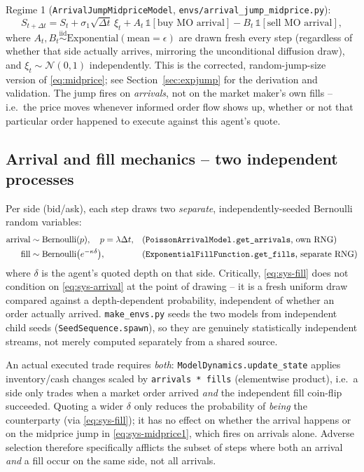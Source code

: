 \documentclass[11pt]{article}
\newcommand{\N}{\mathcal{N}}
\begin{document}
Regime 1 (\texttt{ArrivalJumpMidpriceModel}, \texttt{envs/arrival\_jump\_midprice.py}):
\begin{equation}
S_{t+\Delta t} = S_t + \sigma_1\sqrt{\Delta t}\,\xi_t + A_t\,\mathbb{1}[\text{buy MO arrival}] - B_t\,\mathbb{1}[\text{sell MO arrival}],
\label{eq:sys-midprice1}
\end{equation}
where $A_t, B_t \overset{\text{iid}}{\sim} \mathrm{Exponential}(\text{mean}=\epsilon)$ are drawn fresh every step (regardless of whether that side actually arrives, mirroring the unconditional diffusion draw), and $\xi_t\sim\N(0,1)$ independently. This is the corrected, random-jump-size version of \eqref{eq:midprice}; see Section~\ref{sec:expjump} for the derivation and validation. The jump fires on \emph{arrivals}, not on the market maker's own fills -- i.e.\ the price moves whenever informed order flow shows up, whether or not that particular order happened to execute against this agent's quote.

\subsection{Arrival and fill mechanics -- two independent processes}
\label{sec:sys-arrivalfill}
Per side (bid/ask), each step draws two \emph{separate}, independently-seeded Bernoulli random variables:
\begin{align}
\text{arrival} &\sim \mathrm{Bernoulli}(p), \quad p = \lambda\Delta t, &&\text{(\texttt{PoissonArrivalModel.get\_arrivals}, own RNG)} \label{eq:sys-arrival}\\
\text{fill} &\sim \mathrm{Bernoulli}\big(e^{-\kappa\delta}\big), &&\text{(\texttt{ExponentialFillFunction.get\_fills}, separate RNG)} \label{eq:sys-fill}
\end{align}
where $\delta$ is the agent's quoted depth on that side. Critically, \eqref{eq:sys-fill} does not condition on \eqref{eq:sys-arrival} at the point of drawing -- it is a fresh uniform draw compared against a depth-dependent probability, independent of whether an order actually arrived. \texttt{make\_envs.py} seeds the two models from independent child seeds (\texttt{SeedSequence.spawn}), so they are genuinely statistically independent streams, not merely computed separately from a shared source.

An actual executed trade requires \emph{both}: \texttt{ModelDynamics.update\_state} applies inventory/cash changes scaled by \texttt{arrivals * fills} (elementwise product), i.e.\ a side only trades when a market order arrived \emph{and} the independent fill coin-flip succeeded. Quoting a wider $\delta$ only reduces the probability of \emph{being} the counterparty (via \eqref{eq:sys-fill}); it has no effect on whether the arrival happens or on the midprice jump in \eqref{eq:sys-midprice1}, which fires on arrivals alone. Adverse selection therefore specifically afflicts the subset of steps where both an arrival \emph{and} a fill occur on the same side, not all arrivals.
\end{document}
